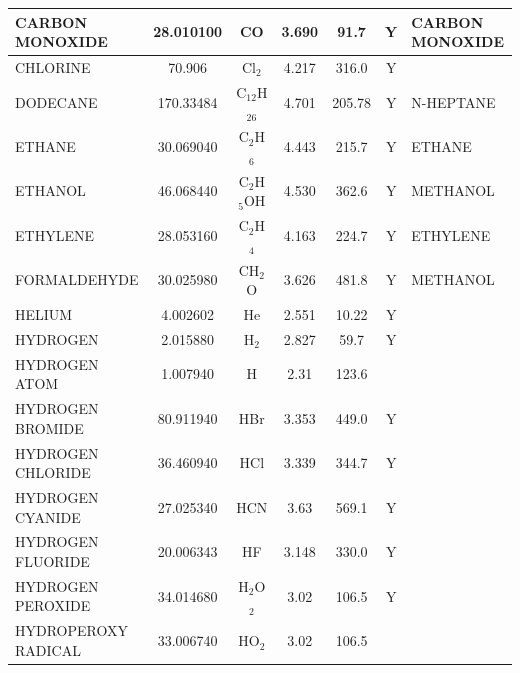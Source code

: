 \documentclass[11pt]{book}
\begin{document}
\begin{longtable}{@{\extracolsep{\fill}}|l|c|c|c|c|c|l|}
{\ct CARBON MONOXIDE}    & 28.010100  & CO               & 3.690    & 91.7     &  Y       &  {\ct CARBON MONOXIDE}     \\ \hline
{\ct CHLORINE}           & 70.906     & Cl$_2$           & 4.217    & 316.0    &  Y       &                            \\ \hline
{\ct DODECANE}           & 170.33484  & C$_12$H$_26$     & 4.701    & 205.78   &  Y       &  {\ct N-HEPTANE}           \\ \hline
{\ct ETHANE}             & 30.069040  & C$_2$H$_6$       & 4.443    & 215.7    &  Y       &  {\ct ETHANE}              \\ \hline
{\ct ETHANOL}            & 46.068440  & C$_2$H$_5$OH     & 4.530    & 362.6    &  Y       &  {\ct METHANOL}            \\ \hline
{\ct ETHYLENE}           & 28.053160  & C$_2$H$_4$       & 4.163    & 224.7    &  Y       &  {\ct ETHYLENE}            \\ \hline
{\ct FORMALDEHYDE}       & 30.025980  & CH$_2$O          & 3.626    & 481.8    &  Y       &  {\ct METHANOL}            \\ \hline
{\ct HELIUM}             & 4.002602   & He               & 2.551    & 10.22    &  Y       &                            \\ \hline
{\ct HYDROGEN}           & 2.015880   & H$_2$            & 2.827    & 59.7     &  Y       &                            \\ \hline
{\ct HYDROGEN ATOM}      & 1.007940   & H                & 2.31     & 123.6    &          &                            \\ \hline
{\ct HYDROGEN BROMIDE}   & 80.911940  & HBr              & 3.353    & 449.0    &  Y       &                            \\ \hline
{\ct HYDROGEN CHLORIDE}  & 36.460940  & HCl              & 3.339    & 344.7    &  Y       &                            \\ \hline
{\ct HYDROGEN CYANIDE}   & 27.025340  & HCN              & 3.63     & 569.1    &  Y       &                            \\ \hline
{\ct HYDROGEN FLUORIDE}  & 20.006343  & HF               & 3.148    & 330.0    &  Y       &                            \\ \hline
{\ct HYDROGEN PEROXIDE}  & 34.014680  & H$_2$O$_2$       & 3.02     & 106.5    &  Y       &                            \\ \hline
{\ct HYDROPEROXY RADICAL}& 33.006740  & HO$_2$           & 3.02     & 106.5    &          &                            \\ \hline

\end{longtable}
\end{document}
